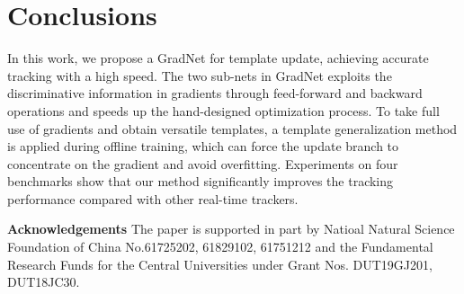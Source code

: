 \documentclass[10pt,twocolumn,letterpaper]{article}
\begin{document}
\section{Conclusions}
In this work, we propose a GradNet for template update, achieving accurate tracking with a high speed.
The two sub-nets in GradNet exploits the discriminative information in gradients through feed-forward and backward operations and speeds up the hand-designed optimization process.
To take full use of gradients and obtain versatile templates, a template generalization method is applied during offline training, which can force the update branch to concentrate on the gradient and avoid overfitting.
Experiments on four benchmarks show that our method
significantly improves the tracking performance compared with other real-time trackers.

\vspace{-3mm}
{\flushleft\textbf{Acknowledgements}}
The paper is supported in part by Natioal Natural Science Foundation of China No.61725202, 61829102, 61751212 and the Fundamental Research Funds for the Central Universities under Grant Nos. DUT19GJ201, DUT18JC30.

\clearpage
{\small


}
\end{document}
